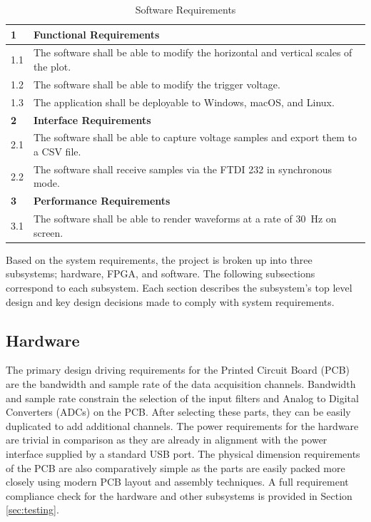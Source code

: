 \documentclass[letterpaper,11pt]{article}
\begin{document}
\begin{table}[H]
  \caption{Software Requirements}
  \begin{tabularx}{\textwidth}{l|l}
    \textbf{1} & \textbf{Functional Requirements}\\
    \hline
    1.1 & The software shall be able to modify the horizontal and vertical scales of the plot. \\
    1.2 & The software shall be able to modify the trigger voltage. \\
    1.3 & The application shall be deployable to Windows, macOS, and Linux. \\
    \hline
    \textbf{2} & \textbf{Interface Requirements} \\
    \hline
    2.1 & The software shall be able to capture voltage samples and export them to a CSV file. \\
    2.2 & The software shall receive samples via the FTDI 232 in synchronous mode. \\
    \hline
    \textbf{3} & \textbf{Performance Requirements} \\
    \hline
    3.1 & The software shall be able to render waveforms at a rate of \SI{30}{\hertz} on screen.
  \end{tabularx} 
  \label{tab:sw-reqs}
\end{table}

Based on the system requirements, the project is broken up into three
subsystems; hardware, FPGA, and software. The following subsections correspond
to each subsystem. Each section describes the subsystem's top level design and
key design decisions made to comply with system requirements.

\subsection{Hardware} %
The primary design driving requirements for the Printed Circuit Board (PCB) are
the bandwidth and sample rate of the data acquisition channels. Bandwidth and
sample rate constrain the selection of the input filters and Analog to Digital
Converters (ADCs) on the PCB. After selecting these parts, they can be easily
duplicated to add additional channels. The power requirements for the hardware
are trivial in comparison as they are already in alignment with the power
interface supplied by a standard USB port. The physical dimension requirements
of the PCB are also comparatively simple as the parts are easily packed more
closely using modern PCB layout and assembly techniques. A full requirement
compliance check for the hardware and other subsystems is provided in Section
\ref{sec:testing}.
\end{document}
